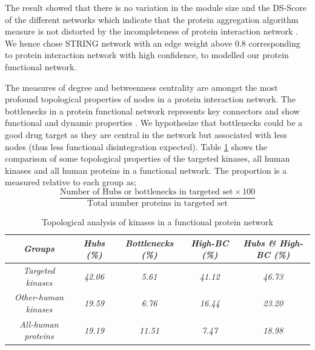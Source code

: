\documentclass[a4paper, 11pt]{report}
\begin{document}
The result showed that there is no variation in the module size and the DS-Score of the different networks which indicate that the protein aggregation algorithm measure is not distorted by the incompleteness of protein interaction network \cite{menche2015uncovering}. We hence chose STRING network with an edge weight above 0.8 corresponding to protein interaction network with high confidence, to modelled our protein functional network. \par
The measures of degree and betweenness centrality are amongst the most profound topological properties of nodes in a protein interaction network. The bottlenecks in a protein functional network represents key connectors and show functional and dynamic properties \cite{yu2007importance}. We hypothesize that bottlenecks could be a good drug target as they are central in the network but associated with less nodes (thus less functional disintegration expected). Table \ref{hubs-bottlenecks} shows the comparison of some topological properties of the targeted kinases, all human kinases and all human proteins in a functional network. The proportion is a measured relative to each group as; 
\[
\frac{\text{Number of Hubs or bottlenecks in targeted set} \times100 } {\text{Total number proteins in targeted set}}
\]

\begin{table}[H]
\centering
\caption{Topological analysis of kinases in a functional protein network}
\label{hubs-bottlenecks}
\begin{tabular}{|c|c|c|c|c|}
\hline
\textit{Groups}             & \textit{Hubs (\%)} & \textit{Bottlenecks (\%)} & \textit{High-BC (\%)} & \textit{Hubs \& High-BC (\%)} \\ \hline
\textit{Targeted kinases}   & \textit{42.06}     & \textit{5.61}              & \textit{41.12}        & \textit{46.73}                \\ \hline
\textit{Other-human kinases}  & \textit{19.59}      & \textit{6.76}             & \textit{16.44}         & \textit{23.20}                  \\ \hline
\textit{All-human proteins} & \textit{19.19}     & \textit{11.51}            & \textit{7.47}         & \textit{18.98}                \\ \hline
\end{tabular}
\end{table}
\end{document}
